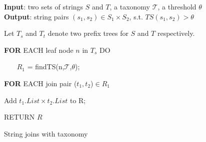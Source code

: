 




\begin{algorithm}
{\bf Input}: two sets of strings $S$ and $T$, a taxonomy $\mathcal{T}$, a threshold $\theta$ \\
{\bf Output}: string pairs $(s_1,s_2) \in S_1 \times S_2$, s.t. $TS(s_1, s_2) > \theta$
\begin{compactenum}[(1)]
\item Let $T_s$ and $T_t$ denote two prefix trees for $S$ and $T$ respectively.
\item {\bf FOR} EACH leaf node $n$ in $T_s$ DO
\item ~~~ $R_1$ = findTS(n,$\mathcal{T}$,$\theta$);
\item {\bf FOR} EACH join pair ($t_1,t_2$)$\in R_1$
\item  Add $t_1.List \times t_2.List$ to R;
\item RETURN $R$
\end{compactenum}
\caption{String joins with taxonomy}
\label{alg:exactjoin}
\end{algorithm}


